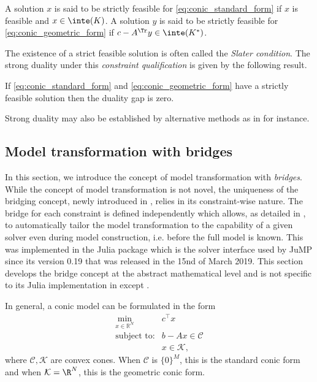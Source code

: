 \documentclass[11pt,twoside,a4paper,openright]{uclouvain-thesis}
\begin{document}
A solution $x$ is said to be strictly feasible for \eqref{eq:conic_standard_form}
if $x$ is feasible and $x \in \inte(K)$.
A solution $y$ is said to be strictly feasible for \eqref{eq:conic_geometric_form}
if $c - A^\Tr y \in \inte(K^*)$.


The existence of a strict feasible solution is often called the \emph{Slater condition}.
The strong duality under this \emph{constraint qualification} is given by the following result.
\begin{mytheo}
  If \eqref{eq:conic_standard_form} and \eqref{eq:conic_geometric_form}
  have a strictly feasible solution then the duality gap is zero.
\end{mytheo}
Strong duality may also be established by alternative methods as in  for instance.





\subsection{Model transformation with bridges}
\label{sec:bridges}

In this section, we introduce the concept of model transformation with \emph{bridges}.
While the concept of model transformation is not novel,
the uniqueness of the bridging concept, newly introduced in \cite{legat2021mathoptinterface},
relies in its constraint-wise nature.
The bridge for each constraint is defined independently
which allows, as detailed in , to automatically
tailor the model transformation to the capability of a given solver
even during model construction, i.e. before the full model is known.
This was implemented in the  Julia package
which is the solver interface used by JuMP since its version 0.19 that was
released in the 15nd of March 2019.
This section develops the bridge concept at the abstract mathematical level
and is not specific to its Julia implementation in  except .


In general, a conic model can be formulated in the form
\begin{equation}\label{eq:conic_form}
    \begin{array}{rl}
        \min\limits_{x\in\mathbb{R}^N} & c^\top x\\
        \text{subject to:} & b - Ax \in \mathcal{C}\\
                           & x \in \mathcal{K},
    \end{array}
\end{equation}
where $\mathcal{C}, \mathcal{K}$ are convex cones.
When $\mathcal{C}$ is $\{0\}^M$, this is the standard conic form and
when $\mathcal{K} = \R^N$, this is the geometric conic form.
\end{document}
